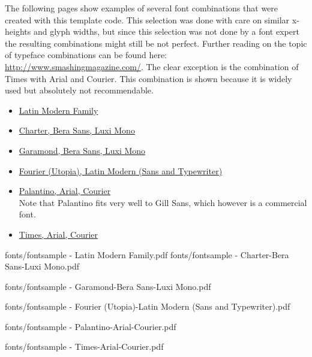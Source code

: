 The following pages show examples of several font combinations that were created with this template code. This selection was done with care on similar x-heights and glyph widths, but since this selection was not done by a font expert the resulting combinations might still be not perfect. Further reading on the topic of typeface combinations can be found here: 
\href{http://www.smashingmagazine.com/2010/11/04/best-practices-of-combining-typefaces/}{http://www.smashingmagazine.com/}. The clear exception is the combination of Times with Arial and Courier. This combination is shown because it is widely used but absolutely not recommendable.

\begin{itemize}
\item \hyperref[sec:doc:fonts:Latin Modern Family]{Latin Modern Family}
\item \hyperref[sec:doc:fonts:Charter-Bera Sans-Luxi Mono]{Charter, Bera Sans, Luxi Mono}
\item \hyperref[sec:doc:fonts:Garamond-Bera Sans-Luxi Mono]{Garamond, Bera Sans, Luxi Mono}
\item \hyperref[sec:doc:fonts:Fourier-Latin Modern]{Fourier (Utopia), Latin Modern (Sans and Typewriter)}
\item \hyperref[sec:doc:fonts:Palantino-Arial-Courier]{Palantino, Arial, Courier} \\ Note that Palantino fits very well to Gill Sans, which however is a commercial font.
\item \hyperref[sec:doc:fonts:Times-Arial-Courier]{Times, Arial, Courier}
\end{itemize}

\cleardoublestandardpage

\label{sec:doc:fonts:Latin Modern Family}
%
	{fonts/fontsample - Latin Modern Family.pdf}
%
\label{sec:doc:fonts:Charter-Bera Sans-Luxi Mono}
%
	{fonts/fontsample - Charter-Bera Sans-Luxi Mono.pdf}
%
\label{sec:doc:fonts:Garamond-Bera Sans-Luxi Mono}

	{fonts/fontsample - Garamond-Bera Sans-Luxi Mono.pdf}
%
\label{sec:doc:fonts:Fourier-Latin Modern}	

	{fonts/fontsample - Fourier (Utopia)-Latin Modern (Sans and Typewriter).pdf}
%
\label{sec:doc:fonts:Palantino-Arial-Courier}

	{fonts/fontsample - Palantino-Arial-Courier.pdf}
%
\label{sec:doc:fonts:Times-Arial-Courier}	

	{fonts/fontsample - Times-Arial-Courier.pdf}
